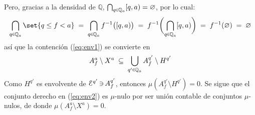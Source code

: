 \begin{sol}
\begin{itemize}[leftmargin=1em]
\begin{equation}
\end{equation}
Pero, gracias a la densidad de $\mathbb{Q}$, $\bigcap_{q\en\mathbb{Q}_a}[q,a) = \varnothing$, por lo cual:
\[
\bigcap_{q\en\mathbb{Q}_a}\set{q \leq f < a} 
\;=\; \bigcap_{q\en\mathbb{Q}_a} f^{-1}\bigl([q,a)\bigr) 
\;=\; f^{-1}\biggl(\bigcap_{q\en\mathbb{Q}_a}[q,a)\biggr) 
\;=\; f^{-1}(\varnothing)
\;=\; \varnothing
\] 
así que la contención (\ref{eq:env1}) se convierte en
\begin{equation}\label{eq:env2}
A^a_f \setminus X^a 
\;\subseteq\; \bigcup_{q'\en\mathbb{Q}_a} A^{q'}_f\setminus H^{q'}
\end{equation}
Como $H^{q'}$ es envolvente de $\mathcal{E}^{q'} \operatorname{\ni} A^{q'}_f$, entonces $\mu(A^{q'}_f\setminus H^{q'}) = 0$. Se sigue que el conjunto derecho en (\ref{eq:env2}) es $\mu$-nulo por ser unión contable de conjuntos $\mu$-nulos, de donde $\mu(A^a_f \setminus X^a) = 0$.


\end{itemize}
\end{sol}
